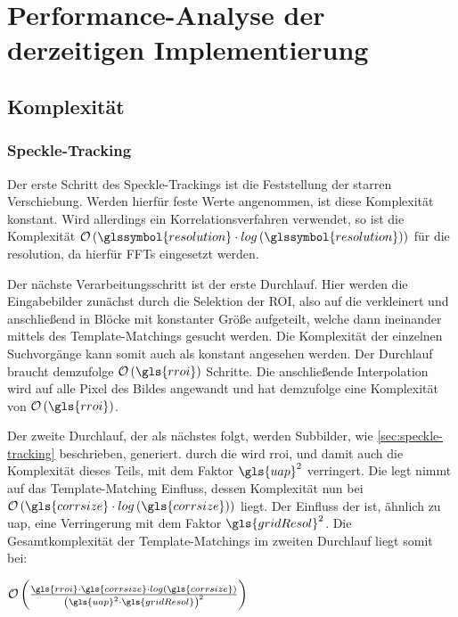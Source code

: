 \chapter{Performance-Analyse der derzeitigen Implementierung}

\section{Komplexität}

\subsection{Speckle-Tracking}

Der erste Schritt des Speckle-Trackings ist die Feststellung der starren Verschiebung. Werden hierfür feste Werte angenommen, ist diese Komplexität konstant. Wird allerdings ein Korrelationsverfahren verwendet, so ist die Komplexität $\mathcal{O}\left(\glssymbol{resolution} \cdot log\left(\glssymbol{resolution}\right)\right)$ für die \gls{resolution}, da hierfür \glspl{FFT} eingesetzt werden. 

Der nächste Verarbeitungsschritt ist der erste Durchlauf. Hier werden die Eingabebilder zunächst durch die Selektion der \gls{ROI}, also auf die   verkleinert und anschließend in Blöcke mit konstanter Größe aufgeteilt, welche dann ineinander mittels des Template-Matchings gesucht werden. Die Komplexität der einzelnen Suchvorgänge kann somit auch als konstant angesehen werden. Der Durchlauf braucht demzufolge $\mathcal{O}\left(\gls{rroi}\right)$ Schritte. Die anschließende Interpolation wird auf alle Pixel des Bildes angewandt und hat demzufolge eine Komplexität von $\mathcal{O}\left(\gls{rroi}\right)$.

Der zweite Durchlauf, der als nächstes folgt, werden Subbilder, wie \ref{sec:speckle-tracking} beschrieben, generiert. durch die   wird \gls{rroi}, und damit auch die Komplexität dieses Teils, mit dem Faktor $\gls{uap}^2$ verringert. Die   legt nimmt auf das Template-Matching Einfluss, dessen Komplexität nun bei $\mathcal{O}\left(\gls{corrsize} \cdot log\left(\gls{corrsize}\right)\right)$ liegt. Der Einfluss der   ist, ähnlich zu \gls{uap}, eine Verringerung mit dem Faktor $\gls{gridResol}^2$. Die Gesamtkomplexität der Template-Matchings im zweiten Durchlauf liegt somit bei:

\begin{center}
	$\mathcal{O}\left(\frac{\gls{rroi} \cdot \gls{corrsize} \cdot log\left(\gls{corrsize}\right)}{\left(\gls{uap}^2 \cdot \gls{gridResol}\right)^2}\right)$
\end{center}

